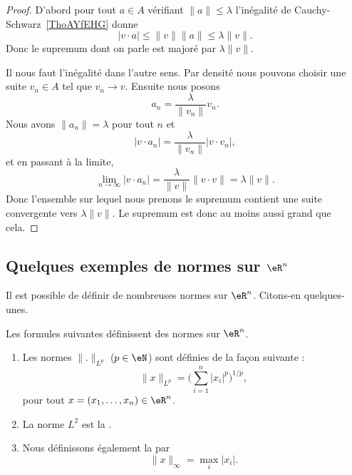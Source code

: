 \begin{proof}
    D'abord pour tout \( a\in A\) vérifiant \( \| a \|\leq \lambda\) l'inégalité de Cauchy-Schwarz~\ref{ThoAYfEHG} donne
    \begin{equation}
        | v\cdot a |\leq \| v \|\| a \|\leq \lambda\| v \|.
    \end{equation}
    Donc le supremum dont on parle est majoré par \( \lambda\| v \|\).

    Il nous faut l'inégalité dans l'autre sens. Par densité nous pouvons choisir une suite \( v_n\in A\) tel que \( v_n\to v\). Ensuite nous posons
    \begin{equation}
        a_n=\frac{ \lambda }{ \| v_n \| }v_n.
    \end{equation}
    Nous avons \( \| a_n \|=\lambda\) pour tout \( n\) et
    \begin{equation}
        | v\cdot a_n |=\frac{ \lambda }{ \| v_n \| }| v\cdot v_n |,
    \end{equation}
    et en passant à la limite,
    \begin{equation}
        \lim_{n\to \infty} | v\cdot a_n |=\frac{ \lambda }{ \| v \| }\| v\cdot v \|=\lambda\| v \|.
    \end{equation}
    Donc l'ensemble sur lequel nous prenons le supremum contient une suite convergente vers \( \lambda\| v \|\). Le supremum est donc au moins aussi grand que cela.
\end{proof}

\subsection{Quelques exemples de normes sur \texorpdfstring{$\eR^n$}{Rn}}

Il est possible de définir de nombreuses normes sur $\eR^n$. Citons-en quelques-unes.

\begin{propositionDef}      \label{PROPooCLZRooIRxCnZ}
    Les formules suivantes définissent des normes sur \( \eR^n\).
    \begin{enumerate}
        \item
    Les normes $\| . \|_{L^p}$ ($p\in\eN$) sont définies de la façon suivante :
    \begin{equation}		\label{EqDeformeLp}
        \| x \|_{L^p}=\Big( \sum_{i=1}^n| x_i |^p\Big)^{1/p},
    \end{equation}
    pour tout $x=(x_1,\ldots,x_n)\in\eR^n$.
\item
    La norme $L^2$ est la .
\item
    Nous définissons également la  par
    \begin{equation}
	    \| x \|_{\infty}=\max_i| x_i |.
    \end{equation}
    \end{enumerate}
\end{propositionDef}

